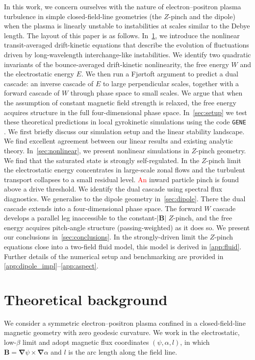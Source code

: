 \documentclass{jpp}
\renewcommand{\vec}[1]{\boldsymbol{#1}}
\newcommand{\vec}[1]{\boldsymbol{#1}}
\newcommand{\grad}{{\vec{\nabla}}}
\newcommand{\gene}{\texttt{GENE}}
\begin{document}
In this work, we concern ourselves with the nature of electron--positron plasma turbulence in simple closed-field-line geometries (the $Z$-pinch and the dipole) when the plasma is linearly unstable to instabilities at scales similar to the Debye length. The layout of this paper is as follows. In~\cref{sec:theory}, we introduce the nonlinear transit-averaged drift-kinetic equations that describe the evolution of fluctuations driven by long-wavelength interchange-like instabilities. We identify two quadratic invariants of the bounce-averaged drift-kinetic nonlinearity, the free energy $W$ and the electrostatic energy $E$. We then run a Fj\o rtoft argument \citep{Fjortoft1953} to predict a dual cascade: an inverse cascade of $E$ to large perpendicular scales, together with a forward cascade of $W$ through phase space to small scales. We argue that when the assumption of constant magnetic field strength is relaxed, the free energy acquires structure in the full four-dimensional phase space. In~\cref{sec:setup} we test these theoretical predictions in local gyrokinetic simulations using the code \gene\, \citep{Jenko2000}. We first briefly discuss our simulation setup and the linear stability landscape. We find excellent agreement between our linear results and existing analytic theory. In~\cref{sec:nonlinear}, we present nonlinear simulations in $Z$-pinch geometry. We find that the saturated state is strongly self-regulated. In the $Z$-pinch limit the electrostatic energy concentrates in large-scale zonal flows and the turbulent transport collapses to a small residual level. \textcolor{red}{An} inward particle pinch is found above a drive threshold. We identify the dual cascade using spectral flux diagnostics. We generalise to the dipole geometry in~\cref{sec:dipole}. There the dual cascade extends into a four-dimensional phase space. The forward $W$ cascade develops a parallel leg inaccessible to the constant-$|\mathbf{B}|$ $Z$-pinch, and the free energy acquires pitch-angle structure (passing-weighted) as it does so. We present our conclusions in~\cref{sec:conclusions}. In the strongly-driven limit the $Z$-pinch equations close into a two-field fluid model, this model is derived in \cref{app:fluid}. Further details of the numerical setup and benchmarking are provided in \cref{app:dipole_impl}--\cref{app:aspect}.


\section{Theoretical background}\label{sec:theory}
We consider a symmetric electron--positron plasma confined in a closed-field-line magnetic geometry with zero geodesic curvature. We work in the electrostatic, low-$\beta$ limit and adopt magnetic flux coordinates $(\psi, \alpha, l)$, in which $\mathbf{B} = \grad\psi \times \grad\alpha$ and $l$ is the arc length along the field line.
\end{document}
